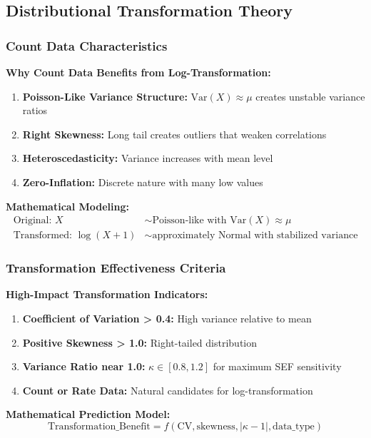 \subsection{Distributional Transformation Theory}

\subsubsection{Count Data Characteristics}

\textbf{Why Count Data Benefits from Log-Transformation:}

\begin{enumerate}
    \item \textbf{Poisson-Like Variance Structure:} $\text{Var}(X) \approx \mu$ creates unstable variance ratios
    \item \textbf{Right Skewness:} Long tail creates outliers that weaken correlations
    \item \textbf{Heteroscedasticity:} Variance increases with mean level
    \item \textbf{Zero-Inflation:} Discrete nature with many low values
\end{enumerate}

\textbf{Mathematical Modeling:}
\begin{align}
\text{Original: } X &\sim \text{Poisson-like with } \text{Var}(X) \approx \mu \\
\text{Transformed: } \log(X + 1) &\sim \text{approximately Normal with stabilized variance}
\end{align}

\subsubsection{Transformation Effectiveness Criteria}

\textbf{High-Impact Transformation Indicators:}
\begin{enumerate}
    \item \textbf{Coefficient of Variation > 0.4:} High variance relative to mean
    \item \textbf{Positive Skewness > 1.0:} Right-tailed distribution
    \item \textbf{Variance Ratio near 1.0:} $\kappa \in [0.8, 1.2]$ for maximum SEF sensitivity
    \item \textbf{Count or Rate Data:} Natural candidates for log-transformation
\end{enumerate}

\textbf{Mathematical Prediction Model:}
\begin{equation}
\text{Transformation\_Benefit} = f(\text{CV}, \text{skewness}, |\kappa - 1|, \text{data\_type})
\end{equation}

